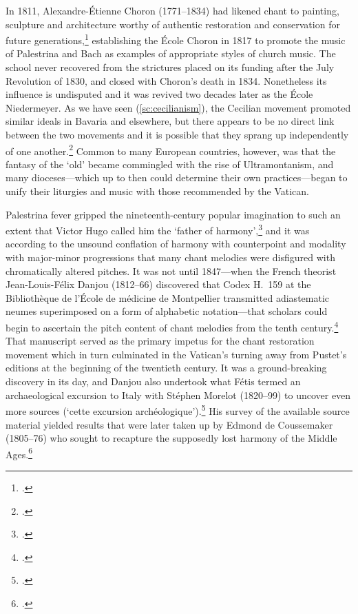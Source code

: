In 1811, Alexandre-Étienne Choron (1771--1834) had likened chant to painting, sculpture and architecture worthy of authentic restoration and conservation for future generations,\footcite[9]{ChoronConsiderationsnecessiteretablir1811} establishing the École Choron in 1817 to promote the music of Palestrina and Bach as examples of appropriate styles of church music.
The school never recovered from the strictures placed on its funding after the July Revolution of 1830, and closed with Choron's death in 1834.
Nonetheless its influence is undisputed and it was revived two decades later as the École Niedermeyer.
As we have seen (\cref{sc:cecilianism}), the Cecilian movement promoted similar ideals in Bavaria and elsewhere, but there appears to be no direct link between the two movements and it is possible that they sprang up independently of one another.\footcite[25]{GarrattPalestrinaGermanRomantic2002}
Common to many European countries, however, was that the fantasy of the `old' became commingled with the rise of Ultramontanism, and many dioceses---which up to then could determine their own practices---began to unify their liturgies and music with those recommended by the Vatican.

Palestrina fever gripped the nineteenth-century popular imagination to such an extent that Victor Hugo called him the `father of harmony',\footcite[209]{HugoQuemusiquedate1840} and it was according to the unsound conflation of harmony with counterpoint and modality with major-minor progressions that many chant melodies were disfigured with chromatically altered pitches.
It was not until 1847---when the French theorist Jean-Louis-Félix Danjou (1812--66) discovered that Codex H.~159 at the Bibliothèque de l'École de médicine de Montpellier transmitted adiastematic neumes superimposed on a form of alphabetic notation---that scholars could begin to ascertain the pitch content of chant melodies from the tenth century.\footcite[This manuscript is known today as `the Dijon tonary' for it came from Saint-Bénigne de Dijon. See][578--9]{HileyWesternPlainchantHandbook1993}
That manuscript served as the primary impetus for the chant restoration movement which in turn culminated in the Vatican's turning away from Pustet's editions at the beginning of the twentieth century.
It was a ground-breaking discovery in its day, and Danjou also undertook what Fétis termed an archaeological excursion to Italy with Stéphen Morelot (1820--99) to uncover even more sources (`cette excursion archéologique').\footcite[195]{FetisBiographieuniversellemusiciens1867}
His survey of the available source material yielded results that were later taken up by Edmond de Coussemaker (1805--76) who sought to recapture the supposedly lost harmony of the Middle Ages.\footcite[121]{CoussemakerHistoireharmonieau1852}

